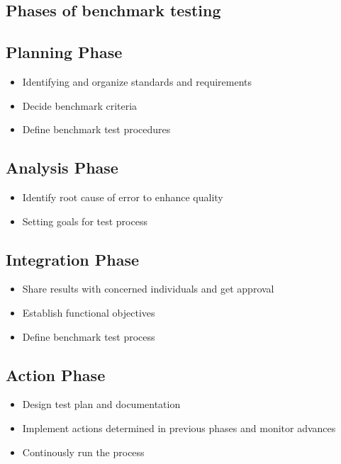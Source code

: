 \documentclass[../thesis.tex]{subfiles}
\begin{document}
	\subsection{Phases of benchmark testing}
	\subsection*{Planning Phase}
	\begin{itemize}
		\item Identifying and organize standards and requirements
		\item Decide benchmark criteria
		\item Define benchmark test procedures
	\end{itemize}
	\subsection*{Analysis Phase}
	\begin{itemize}
		\item Identify root cause of error to enhance quality
		\item Setting goals for test process
	\end{itemize}
	\subsection*{Integration Phase}
	\begin{itemize}
		\item Share results with concerned individuals and get approval
		\item Establish functional objectives
		\item Define benchmark test process
	\end{itemize}
	\subsection*{Action Phase}
	\begin{itemize}
		\item Design test plan and documentation
		\item Implement actions determined in previous phases and monitor advances
		\item Continously run the process
	\end{itemize}
\end{document}
